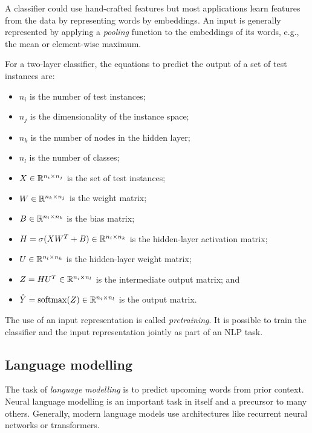 A classifier could use hand-crafted features but most applications learn
features from the data by representing words by embeddings.
An input is generally represented by applying a \textit{pooling} function to the
embeddings of its words, e.g., the mean or element-wise maximum.

For a two-layer classifier, the equations to predict the output of a set of test
instances are:
\begin{itemize}
  \item $n_i$ is the number of test instances;
  \item $n_j$ is the dimensionality of the instance space;
  \item $n_k$ is the number of nodes in the hidden layer;
  \item $n_l$ is the number of classes;
  \item $X \in \mathbb{R}^{n_i \times n_j}$ is the set of test instances;
  \item $W \in \mathbb{R}^{n_k \times n_j}$ is the weight matrix;
  \item $B \in \mathbb{R}^{n_i \times n_k}$ is the bias matrix;
  \item $H = \sigma(X W^{T} + B) \in \mathbb{R}^{n_i \times n_k}$
        is the hidden-layer activation matrix;
  \item $U \in \mathbb{R}^{n_l \times n_k}$ is the hidden-layer weight matrix;
  \item $Z = H U^{T} \in \mathbb{R}^{n_i \times n_l}$ is the intermediate output matrix; and
  \item $\hat{Y} = \operatorname{softmax}(Z) \in \mathbb{R}^{n_i \times n_l}$ is the output matrix.
\end{itemize}

The use of an input representation is called \textit{pretraining}.
It is possible to train the classifier and the input representation jointly as
part of an NLP task.

\subsection{Language modelling}

The task of \textit{language modelling} is to predict upcoming words from prior
context.
Neural language modelling is an important task in itself and a precursor to many
others.
Generally, modern language models use architectures like recurrent neural
networks or transformers.

